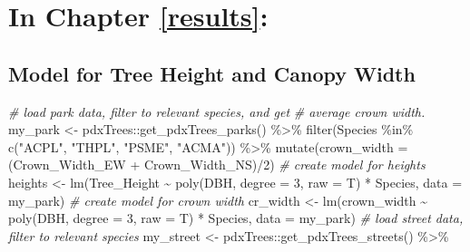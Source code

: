 \documentclass[12pt,twoside]{reedthesis}
\newenvironment{Shaded}{\begin{snugshade}}{\end{snugshade}}
\newcommand{\AttributeTok}[1]{\textcolor[rgb]{0.77,0.63,0.00}{#1}}
\newcommand{\CommentTok}[1]{\textcolor[rgb]{0.56,0.35,0.01}{\textit{#1}}}
\newcommand{\DecValTok}[1]{\textcolor[rgb]{0.00,0.00,0.81}{#1}}
\newcommand{\FunctionTok}[1]{\textcolor[rgb]{0.00,0.00,0.00}{#1}}
\newcommand{\NormalTok}[1]{#1}
\newcommand{\OtherTok}[1]{\textcolor[rgb]{0.56,0.35,0.01}{#1}}
\newcommand{\SpecialCharTok}[1]{\textcolor[rgb]{0.00,0.00,0.00}{#1}}
\newcommand{\StringTok}[1]{\textcolor[rgb]{0.31,0.60,0.02}{#1}}
\begin{document}
\hypertarget{in-chapter-refresults}{%
\section{\texorpdfstring{\textbf{In Chapter} \ref{results}\textbf{:}}{In Chapter \ref{results}:}}\label{in-chapter-refresults}}

\hypertarget{model-for-tree-height-and-canopy-width}{%
\subsection*{Model for Tree Height and Canopy Width}\label{model-for-tree-height-and-canopy-width}}

\footnotesize
\begin{Shaded}
\begin{Highlighting}[]
\CommentTok{\# load park data, filter to relevant species, and get}
\CommentTok{\# average crown width.}
\NormalTok{my\_park }\OtherTok{\textless{}{-}}\NormalTok{ pdxTrees}\SpecialCharTok{::}\FunctionTok{get\_pdxTrees\_parks}\NormalTok{() }\SpecialCharTok{\%\textgreater{}\%}
    \FunctionTok{filter}\NormalTok{(Species }\SpecialCharTok{\%in\%} \FunctionTok{c}\NormalTok{(}\StringTok{"ACPL"}\NormalTok{, }\StringTok{"THPL"}\NormalTok{, }\StringTok{"PSME"}\NormalTok{, }\StringTok{"ACMA"}\NormalTok{)) }\SpecialCharTok{\%\textgreater{}\%}
    \FunctionTok{mutate}\NormalTok{(}\AttributeTok{crown\_width =}\NormalTok{ (Crown\_Width\_EW }\SpecialCharTok{+}\NormalTok{ Crown\_Width\_NS)}\SpecialCharTok{/}\DecValTok{2}\NormalTok{)}
\CommentTok{\# create model for heights}
\NormalTok{heights }\OtherTok{\textless{}{-}} \FunctionTok{lm}\NormalTok{(Tree\_Height }\SpecialCharTok{\textasciitilde{}} \FunctionTok{poly}\NormalTok{(DBH, }\AttributeTok{degree =} \DecValTok{3}\NormalTok{, }\AttributeTok{raw =}\NormalTok{ T) }\SpecialCharTok{*}
\NormalTok{    Species, }\AttributeTok{data =}\NormalTok{ my\_park)}
\CommentTok{\# create model for crown width}
\NormalTok{cr\_width }\OtherTok{\textless{}{-}} \FunctionTok{lm}\NormalTok{(crown\_width }\SpecialCharTok{\textasciitilde{}} \FunctionTok{poly}\NormalTok{(DBH, }\AttributeTok{degree =} \DecValTok{3}\NormalTok{, }\AttributeTok{raw =}\NormalTok{ T) }\SpecialCharTok{*}
\NormalTok{    Species, }\AttributeTok{data =}\NormalTok{ my\_park)}
\CommentTok{\# load street data, filter to relevant species}
\NormalTok{my\_street }\OtherTok{\textless{}{-}}\NormalTok{ pdxTrees}\SpecialCharTok{::}\FunctionTok{get\_pdxTrees\_streets}\NormalTok{() }\SpecialCharTok{\%\textgreater{}\%}

\end{Highlighting}
\end{Shaded}
\end{document}
